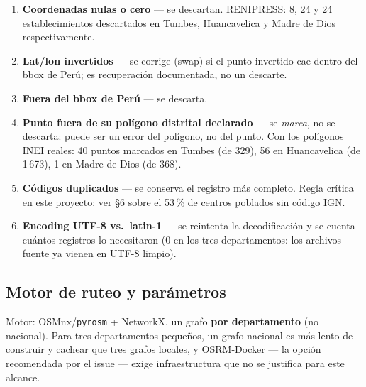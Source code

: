 \documentclass[11pt]{article}
\begin{document}
\begin{enumerate}
\item \textbf{Coordenadas nulas o cero} --- se descartan. RENIPRESS: 8, 24 y
  24 establecimientos descartados en Tumbes, Huancavelica y Madre de Dios
  respectivamente.
\item \textbf{Lat/lon invertidos} --- se corrige (swap) si el punto
  invertido cae dentro del bbox de Perú; es recuperación documentada, no un
  descarte.
\item \textbf{Fuera del bbox de Perú} --- se descarta.
\item \textbf{Punto fuera de su polígono distrital declarado} --- se
  \emph{marca}, no se descarta: puede ser un error del polígono, no del
  punto. Con los polígonos INEI reales: 40 puntos marcados en Tumbes (de
  329), 56 en Huancavelica (de 1\,673), 1 en Madre de Dios (de 368).
\item \textbf{Códigos duplicados} --- se conserva el registro más completo.
  Regla crítica en este proyecto: ver \S6 sobre el 53\,\% de centros
  poblados sin código IGN.
\item \textbf{Encoding UTF-8 vs.\ latin-1} --- se reintenta la decodificación
  y se cuenta cuántos registros lo necesitaron (0 en los tres
  departamentos: los archivos fuente ya vienen en UTF-8 limpio).
\end{enumerate}

\subsection{Motor de ruteo y parámetros}

Motor: OSMnx/\texttt{pyrosm} + NetworkX, un grafo \textbf{por departamento}
(no nacional). Para tres departamentos pequeños, un grafo nacional es más
lento de construir y cachear que tres grafos locales, y OSRM-Docker --- la
opción recomendada por el issue --- exige infraestructura que no se
justifica para este alcance.
\end{document}
